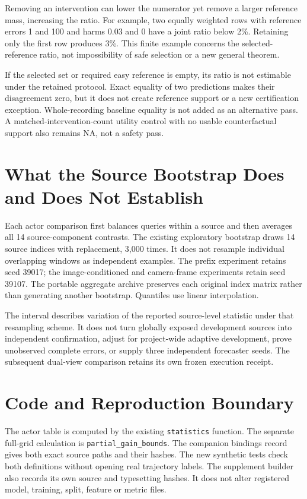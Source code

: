 \documentclass[10pt,twocolumn,letterpaper]{article}
\begin{document}
Removing an intervention can lower the numerator yet remove a larger reference mass, increasing the ratio. For example, two equally weighted rows with reference errors 1 and 100 and harms 0.03 and 0 have a joint ratio below 2\%. Retaining only the first row produces 3\%. This finite example concerns the selected-reference ratio, not impossibility of safe selection or a new general theorem.


If the selected set or required easy reference is empty, its ratio is not estimable under the retained protocol. Exact equality of two predictions makes their disagreement zero, but it does not create reference support or a new certification exception. Whole-recording baseline equality is not added as an alternative pass. A matched-intervention-count utility control with no usable counterfactual support also remains NA, not a safety pass.


\section{What the Source Bootstrap Does and Does Not Establish}

Each actor comparison first balances queries within a source and then averages all 14 source-component contrasts. The existing exploratory bootstrap draws 14 source indices with replacement, 3,000 times. It does not resample individual overlapping windows as independent examples. The prefix experiment retains seed 39017; the image-conditioned and camera-frame experiments retain seed 39107. The portable aggregate archive preserves each original index matrix rather than generating another bootstrap. Quantiles use linear interpolation.


The interval describes variation of the reported source-level statistic under that resampling scheme. It does not turn globally exposed development sources into independent confirmation, adjust for project-wide adaptive development, prove unobserved complete errors, or supply three independent forecaster seeds. The subsequent dual-view comparison retains its own frozen execution receipt.


\section{Code and Reproduction Boundary}

The actor table is computed by the existing \texttt{statistics} function. The separate full-grid calculation is \texttt{partial\_gain\_bounds}. The companion bindings record gives both exact source paths and their hashes. The new synthetic tests check both definitions without opening real trajectory labels. The supplement builder also records its own source and typesetting hashes. It does not alter registered model, training, split, feature or metric files.
\end{document}
